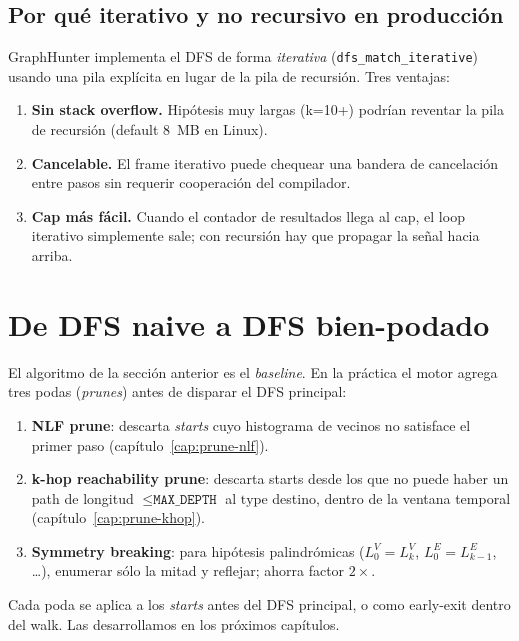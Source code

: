 \subsection{Por qué iterativo y no recursivo en producción}

GraphHunter implementa el DFS de forma \emph{iterativa}
(\texttt{dfs\_match\_iterative}) usando una pila explícita en lugar
de la pila de recursión. Tres ventajas:

\begin{enumerate}
    \item \textbf{Sin stack overflow.} Hipótesis muy largas
    (k=10+) podrían reventar la pila de recursión (default 8~MB en
    Linux).
    \item \textbf{Cancelable.} El frame iterativo puede chequear
    una bandera de cancelación entre pasos sin requerir
    cooperación del compilador.
    \item \textbf{Cap más fácil.} Cuando el contador de resultados
    llega al cap, el loop iterativo simplemente sale; con
    recursión hay que propagar la señal hacia arriba.
\end{enumerate}

\section{De DFS naive a DFS bien-podado}

El algoritmo de la sección anterior es el \emph{baseline}. En la
práctica el motor agrega tres podas (\emph{prunes}) antes de
disparar el DFS principal:

\begin{enumerate}
    \item \textbf{NLF prune}: descarta \emph{starts} cuyo histograma
    de vecinos no satisface el primer paso
    (capítulo~\ref{cap:prune-nlf}).
    \item \textbf{k-hop reachability prune}: descarta starts desde
    los que no puede haber un path de longitud \(\leq
    \texttt{MAX\_DEPTH}\) al \(\mathrm{type}\) destino, dentro de
    la ventana temporal (capítulo~\ref{cap:prune-khop}).
    \item \textbf{Symmetry breaking}: para hipótesis palindrómicas
    (\(L_0^V = L_k^V\), \(L_0^E = L_{k-1}^E\), \dots), enumerar
    sólo la mitad y reflejar; ahorra factor \(2\times\).
\end{enumerate}

\noindent
Cada poda se aplica a los \emph{starts} antes del DFS principal,
o como early-exit dentro del walk. Las desarrollamos en los
próximos capítulos.

